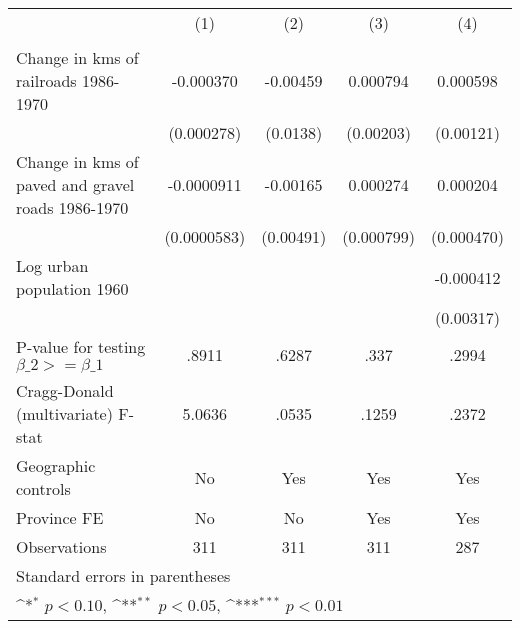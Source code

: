 {
\def\sym#1{\ifmmode^{#1}\else\(^{#1}\)\fi}
\begin{tabular}{l*{4}{c}}
\hline\hline
                &\multicolumn{1}{c}{(1)}&\multicolumn{1}{c}{(2)}&\multicolumn{1}{c}{(3)}&\multicolumn{1}{c}{(4)}\\
                &\multicolumn{1}{c}{}&\multicolumn{1}{c}{}&\multicolumn{1}{c}{}&\multicolumn{1}{c}{}\\
\hline
Change in kms of railroads 1986-1970&-0.000370         & -0.00459         & 0.000794         & 0.000598         \\
                &(0.000278)         & (0.0138)         &(0.00203)         &(0.00121)         \\
[1em]
Change in kms of paved and gravel roads 1986-1970&-0.0000911         & -0.00165         & 0.000274         & 0.000204         \\
                &(0.0000583)         &(0.00491)         &(0.000799)         &(0.000470)         \\
[1em]
Log urban population 1960&                  &                  &                  &-0.000412         \\
                &                  &                  &                  &(0.00317)         \\
\hline
P-value for testing $\beta\_{2} >= \beta\_{1}$&    .8911         &    .6287         &     .337         &    .2994         \\
Cragg-Donald (multivariate) F-stat&   5.0636         &    .0535         &    .1259         &    .2372         \\
Geographic controls&       No         &      Yes         &      Yes         &      Yes         \\
Province FE     &       No         &       No         &      Yes         &      Yes         \\
Observations    &      311         &      311         &      311         &      287         \\
\hline\hline
\multicolumn{5}{l}{\footnotesize Standard errors in parentheses}\\
\multicolumn{5}{l}{\footnotesize \sym{*} \(p<0.10\), \sym{**} \(p<0.05\), \sym{***} \(p<0.01\)}\\
\end{tabular}
}
